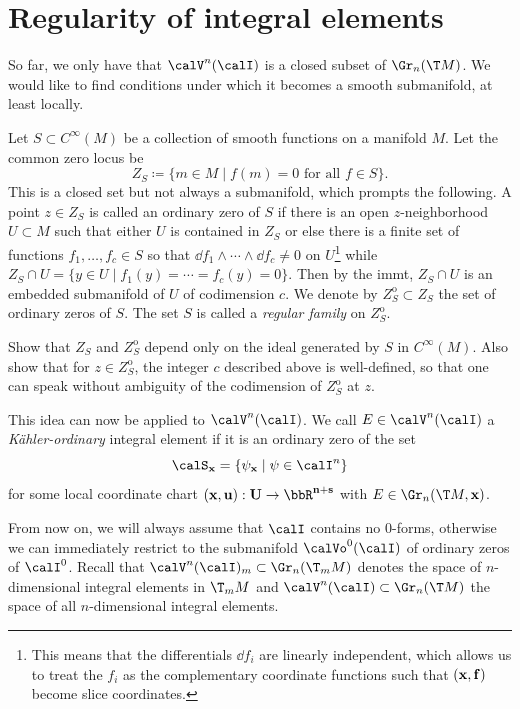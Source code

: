 \section{Regularity of integral elements}

So far, we only have that $\calV^n(\calI)$ is a closed subset of $\Gr_n(\T M)$. We would like to find conditions under which it becomes a smooth submanifold, at least locally.

\begin{defn}\label{def ordinary zero}
    Let $S\subset C^\infty(M)$ be a collection of smooth functions on a manifold $M$. Let the common zero locus be 
    \[Z_S\coloneqq \{m\in M\mid f(m)=0\text{ for all }f\in S\}.\]
    This is a closed set but not always a submanifold, which prompts the following. A point $z\in Z_S$ is called an ordinary zero of $S$ if there is an open $z$-neighborhood $U\subset M$ such that either $U$ is contained in $Z_S$ or else there is a finite set of functions $f_1,\ldots,f_c\in S$ so that $\dd f_1\wedge\cdots\wedge\dd f_c\neq 0$ on $U$\footnote{This means that the differentials $\dd f_i$ are linearly independent, which allows us to treat the $f_i$ as the complementary coordinate functions such that $(\bf{x},\bf{f})$ become slice coordinates.} while $Z_S\cap U=\{y\in U\mid f_1(y)=\cdots =f_c(y)=0\}$. Then by the \gls{immt}, $Z_S\cap U$ is an embedded submanifold of $U$ of codimension $c$. We denote by $Z^{\mathrm{o}}_S\subset Z_S$ the set of ordinary zeros of $S$. The set $S$ is called a \emph{regular family} on $Z_S^{\mathrm{o}}$. 
\end{defn}

\begin{xca}
    Show that $Z_S$ and $Z_S^{\mathrm{o}}$ depend only on the ideal generated by $S$ in $C^\infty(M)$. Also show that for $z\in Z_S^{\mathrm{o}}$, the integer $c$ described above is well-defined, so that one can speak without ambiguity of the codimension of $Z_S^{\mathrm{o}}$ at $z$.
\end{xca}

This idea can now be applied to $\calV^n(\calI)$. We call $E\in\calV^n(\calI)$ a \emph{K\"ahler-ordinary} integral element if it is an ordinary zero of the set 
\[\calS_{\bf{x}}=\{\psi_{\bf{x}}\mid \psi\in\calI^n\}\]
for some local coordinate chart $(\bf{x},\bf{u}):U\to \bbR^{n+s}$ with $E\in\Gr_n(\T M,\bf{x})$.

From now on, we will always assume that $\calI$ contains no $0$-forms, otherwise we can immediately restrict to the submanifold $\calVo^0(\calI)$ of ordinary zeros of $\calI^0$. Recall that $\calV^n(\calI)_m\subset \Gr_n(\T_m M)$ denotes the space of $n$-dimensional integral elements in $\T_m M$ and $\calV^n(\calI)\subset \Gr_n(\T M)$ the space of all $n$-dimensional integral elements. 

